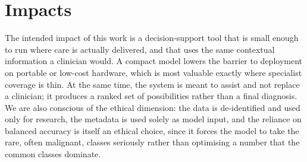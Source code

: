 \section{Impacts}

The intended impact of this work is a decision-support tool that is small enough
to run where care is actually delivered, and that uses the same contextual
information a clinician would. A compact model lowers the barrier to deployment
on portable or low-cost hardware, which is most valuable exactly where
specialist coverage is thin. At the same time, the system is meant to assist and
not replace a clinician; it produces a ranked set of possibilities rather than a
final diagnosis. We are also conscious of the ethical dimension: the data is
de-identified and used only for research, the metadata is used solely as model
input, and the reliance on balanced accuracy is itself an ethical choice, since
it forces the model to take the rare, often malignant, classes seriously rather
than optimising a number that the common classes dominate.

